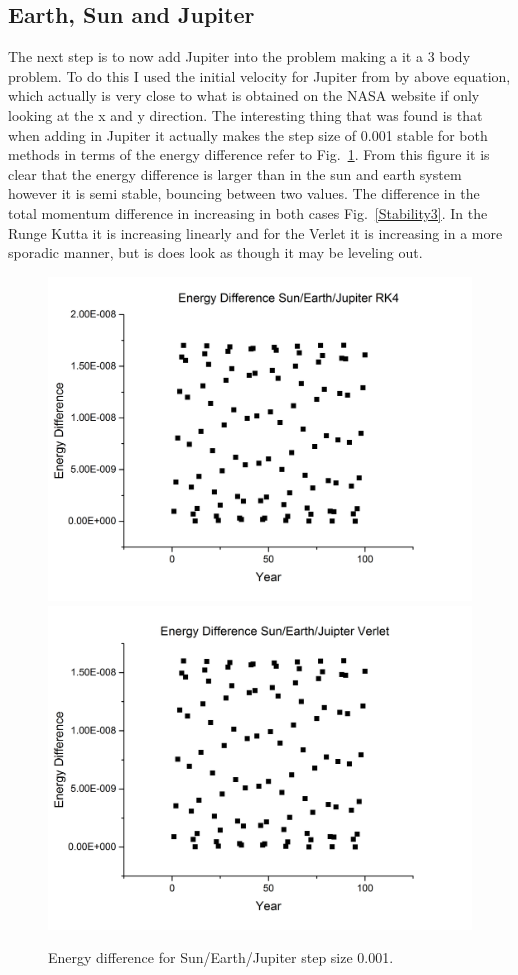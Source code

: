 \documentclass[12pt,righttag]{article}
\begin{document}
\subsection{Earth, Sun and Jupiter}
The next step is to now add Jupiter into the problem making a it a 3 body problem. To do this I used the initial velocity for Jupiter from by above equation, which actually is very close to what is obtained on the NASA website if only looking at the x and y direction. The interesting thing that was found is that when adding in Jupiter it actually makes the step size of 0.001 stable for both methods in terms of the energy difference refer to Fig.~\ref{Stability2}. From this figure it is clear that the energy difference is larger than in the sun and earth system however it is semi stable, bouncing between two values. The difference in the total momentum difference in increasing in both cases Fig.~\ref{Stability3}. In the Runge Kutta it is increasing linearly and for the Verlet it is increasing in a more sporadic manner, but is does look as though it may be leveling out.
\begin{figure}

	\includegraphics[scale=0.24]{Graph10.png}
	\includegraphics[scale=0.24]{Graph11.png}
	\caption{\label{Stability2} Energy difference for Sun/Earth/Jupiter step size 0.001. }
		\end{figure}		
		
\end{document}

